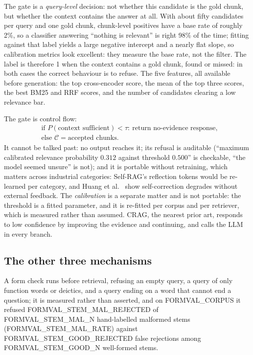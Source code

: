 \documentclass[conference]{IEEEtran}
\begin{document}
The gate is a \emph{query-level} decision: not whether this candidate is the
gold chunk, but whether the context contains the answer at all. With about
fifty candidates per query and one gold chunk, chunk-level positives have a
base rate of roughly 2\%, so a classifier answering ``nothing is relevant''
is right 98\% of the time; fitting against that label yields a large negative
intercept and a nearly flat slope, so calibration metrics look excellent:
they measure the base rate, not the filter. The label is therefore 1 when the
context contains a gold chunk, found or missed: in both cases the correct
behaviour is to refuse. The five features, all available before generation:
the top cross-encoder score, the mean of the top three scores, the best BM25
and RRF scores, and the number of candidates clearing a low relevance bar.

The gate is control flow:
\begin{equation}
\begin{aligned}
&\text{if } P(\text{context sufficient}) < \tau:\ \text{return no-evidence response},\\[-1pt]
&\text{else } \mathcal{C}=\text{accepted chunks}.
\end{aligned}
\label{eq:gate}
\end{equation}
It cannot be talked past: no output reaches it; its refusal is auditable
(``maximum calibrated relevance probability $0.312$ against threshold
$0.500$'' is checkable, ``the model seemed unsure'' is not); and it is
portable without retraining, which matters across industrial categories:
Self-RAG's reflection tokens would be re-learned per category, and Huang
et al.~\cite{huang2024selfcorrect} show self-correction degrades without
external feedback. The \emph{calibration} is a separate matter and is not
portable: the threshold is a fitted parameter, and it is re-fitted per corpus
and per retriever, which is measured rather than assumed. CRAG, the nearest prior art, responds to low confidence by
improving the evidence and continuing, and calls the LLM in every branch.

\subsection{The other three mechanisms}

A form check runs before retrieval, refusing an empty query, a query of only
function words or deictics, and a query ending on a word that cannot end a
question; it is measured rather than asserted, and on
{{FORMVAL_CORPUS}} it refused {{FORMVAL_STEM_MAL_REJECTED}} of
{{FORMVAL_STEM_MAL_N}} hand-labelled malformed stems
({{FORMVAL_STEM_MAL_RATE}}) against {{FORMVAL_STEM_GOOD_REJECTED}} false
rejections among {{FORMVAL_STEM_GOOD_N}} well-formed stems.
\end{document}
